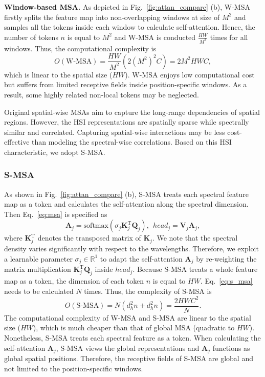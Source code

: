 \documentclass[10pt,twocolumn,letterpaper]{article}
\begin{document}
\noindent\textbf{Window-based MSA.} As depicted in Fig.~\ref{fig:attan_compare} (b), W-MSA firstly splits the feature map into non-overlapping windows at size of $M^2$ and samples all the tokens inside each window to calculate self-attention. Hence, the number of tokens $n$ is equal to $M^2$ and W-MSA is conducted $\frac{HW}{M^2}$ times for all windows. Thus, the computational complexity is 
\begin{equation}
O(\text{W-MSA}) =  \frac{HW}{M^2}(2(M^2)^2C) = 2M^2HWC, 
\label{eq:cost_w_msa}
\end{equation}
which is linear to the spatial size ($HW$). W-MSA enjoys low computational cost but suffers from limited receptive fields inside position-specific windows. As a result, some highly related non-local tokens may be neglected. 

Original spatial-wise MSAs aim to capture the long-range dependencies of spatial regions. However, the HSI representations are spatially sparse while spectrally similar and correlated. Capturing spatial-wise interactions may be less cost-effective than modeling the spectral-wise correlations. Based on this HSI characteristic, we adopt S-MSA.

\subsubsection{S-MSA}
As shown in Fig.~\ref{fig:attan_compare} (b), S-MSA treats each spectral feature map as a token and calculates the self-attention along the spectral dimension. Then Eq.~\eqref{eq:msa} is specified as 
\begin{equation}
\mathbf{A}_j = \text{softmax}(\sigma_j \mathbf{K}_j^\text{T} \mathbf{Q}_j), ~~{head}_j  =\mathbf{V}_j \mathbf{A}_j, 
\label{eq:s_msa}
\end{equation}
where $\mathbf{K}_j^\text{T}$ denotes the transposed matrix of $\mathbf{K}_j$. We note that the spectral density varies significantly with respect to the wavelengths. Therefore, we exploit a learnable parameter $\sigma_j \in \mathbb{R}^{1}$ to adapt the self-attention $\mathbf{A}_j$ by re-weighting the matrix multiplication $\mathbf{K}_j^\text{T} \mathbf{Q}_j$ inside $head_j$. Because S-MSA treats a whole feature map as a token, the dimension of each token $n$ is equal to $HW$. Eq.~\eqref{eq:s_msa} needs to be calculated $N$ times. Thus, the complexity of  S-MSA is 
\begin{equation}
O(\text{S-MSA}) = N (d_h^2 n + d_h^2 n) = \frac{2HWC^2}{N}.
\label{eq:cost_Spectra_msa}
\end{equation}
The computational complexity of W-MSA and S-MSA are linear to the spatial size ($HW$), which is much cheaper than that of global MSA (quadratic to $HW$). Nonetheless, S-MSA treats each spectral feature as a token. When calculating the self-attention $\mathbf{A}_j$, S-MSA views the global representations and $\mathbf{A}_j$ functions as global spatial positions. Therefore, the receptive fields of S-MSA are global and not limited to the position-specific windows. 
\end{document}
